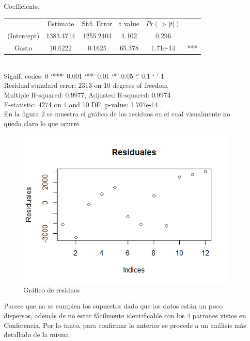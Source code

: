 \documentclass[12pt,a4paper]{article}
\begin{document}
	Coefficients:\\

	\begin{tabular}{cccccc}
		 &     Estimate & Std. Error&     t value&   $Pr(>|t|)$&\\
		(Intercept) & 1383.4714 & 1255.2404 &  1.102  &  0.296&\\
		 Gasto      &   10.6222 &   0.1625  & 65.378  & 1.71e-14 &***\\
	\end{tabular}\\
	
	Signif. codes:  0 ‘***’ 0.001 ‘**’ 0.01 ‘*’ 0.05 ‘.’ 0.1 ‘ ’ 1\\
	
	Residual standard error: 2313 on 10 degrees of freedom\\
	
	Multiple R-squared:  0.9977,	Adjusted R-squared:  0.9974\\ 
	
	F-statistic:  4274 on 1 and 10 DF,  p-value: 1.707e-14\\
	
	En la figura 2 se muestra el gráfico de los residuos en el cual visualmente no queda claro lo que ocurre.
	
	\begin{figure}[!h]
		\centering
			\includegraphics[scale=0.8]{images/PLOT1.png}
		\caption{\small{Gráfico de residuos }}
	\end{figure}
	

	Parece que no se cumplen los supuestos dado que los datos están un poco dispersos, además de no estar fácilmente identificable con los 4 patrones vistos en Conferencia. Por lo tanto, para confirmar lo anterior se procede a un análisis más detallado de la misma.
	
\end{document}
